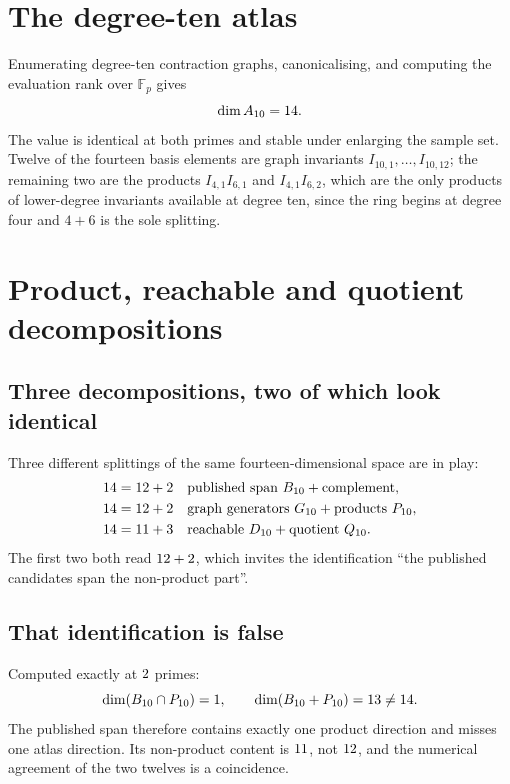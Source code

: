 \documentclass[11pt,a4paper]{article}
\begin{document}
\section{The degree-ten atlas}
\label{sec:atlas}

Enumerating degree-ten contraction graphs, canonicalising, and computing the
evaluation rank over $\mathbb{F}_p$ gives
\begin{equation}
  \dim A_{10} = 14 .
\end{equation}
The value is identical at both primes and stable under enlarging the sample set.
Twelve of the fourteen basis elements are graph invariants $I_{10,1},\ldots,
I_{10,12}$; the remaining two are the products $I_{4,1}I_{6,1}$ and
$I_{4,1}I_{6,2}$, which are the only products of lower-degree invariants
available at degree ten, since the ring begins at degree four and $4+6$ is the
sole splitting.

\section{Product, reachable and quotient decompositions}
\label{sec:decomp}

\subsection{Three decompositions, two of which look identical}

Three different splittings of the same fourteen-dimensional space are in play:
\begin{align}
  14 &= 12 + 2  &&\text{published span } B_{10} + \text{complement},\\
  14 &= 12 + 2 &&\text{graph generators } G_{10} + \text{products } P_{10},\\
  14 &= 11 + 3 &&\text{reachable } D_{10} + \text{quotient } Q_{10}.
\end{align}
The first two both read $12 + 2$, which invites the identification
``the published candidates span the non-product part''.

\subsection{That identification is false}

Computed exactly at $2$ primes:
\begin{equation}
  \dim(B_{10}\cap P_{10}) = 1,
  \qquad
  \dim(B_{10} + P_{10}) = 13 \ne 14 .
\end{equation}
The published span therefore contains exactly one product direction and misses
one atlas direction. Its non-product content is $11$, not
$12$, and the numerical agreement of the two twelves is a coincidence.
\end{document}
